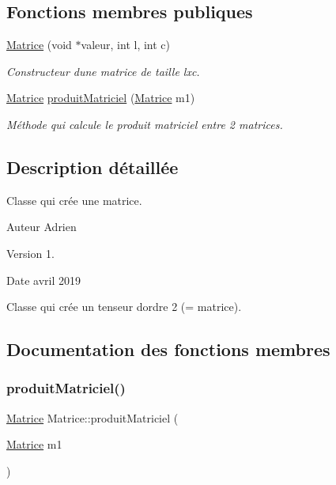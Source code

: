\subsection*{Fonctions membres publiques}
\begin{DoxyCompactItemize}
\item 
\mbox{\label{classMatrice_aefac14911f8386860ddbac4c3a3c8812}} 
\hyperlink{classMatrice_aefac14911f8386860ddbac4c3a3c8812}{Matrice} (void $\ast$valeur, int l, int c)
\begin{DoxyCompactList}\small\item\em Constructeur d\textquotesingle{}une matrice de taille lxc. \end{DoxyCompactList}\item 
\hyperlink{classMatrice}{Matrice} \hyperlink{classMatrice_a80ddaeb41cd4e71cd2edd13c206c109d}{produit\+Matriciel} (\hyperlink{classMatrice}{Matrice} m1)
\begin{DoxyCompactList}\small\item\em Méthode qui calcule le produit matriciel entre 2 matrices. \end{DoxyCompactList}\end{DoxyCompactItemize}


\subsection{Description détaillée}
Classe qui crée une matrice. 

\begin{DoxyAuthor}{Auteur}
Adrien 
\end{DoxyAuthor}
\begin{DoxyVersion}{Version}
1. 
\end{DoxyVersion}
\begin{DoxyDate}{Date}
avril 2019
\end{DoxyDate}
Classe qui crée un tenseur d\textquotesingle{}ordre 2 (= matrice). 

\subsection{Documentation des fonctions membres}
\mbox{\label{classMatrice_a80ddaeb41cd4e71cd2edd13c206c109d}} 
\subsubsection{\texorpdfstring{produit\+Matriciel()}{produitMatriciel()}}
{\footnotesize\ttfamily \hyperlink{classMatrice}{Matrice} Matrice\+::produit\+Matriciel (\begin{DoxyParamCaption}\item[{\hyperlink{classMatrice}{Matrice}}]{m1 }\end{DoxyParamCaption})}



